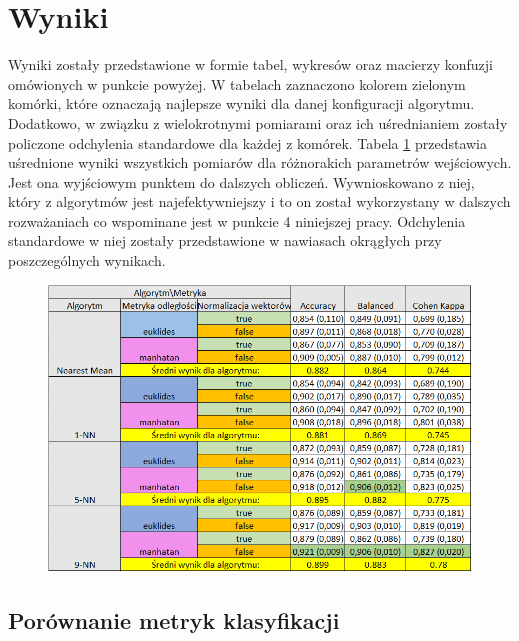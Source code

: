 \documentclass[12pt]{article}
\begin{document}
\section{Wyniki}
Wyniki zostały przedstawione w formie tabel, wykresów oraz macierzy konfuzji omówionych w punkcie powyżej. W tabelach zaznaczono kolorem zielonym komórki, które oznaczają najlepsze wyniki dla danej konfiguracji algorytmu. Dodatkowo, w związku z wielokrotnymi pomiarami oraz ich uśrednianiem zostały policzone odchylenia standardowe dla każdej z komórek. Tabela  \ref{glowna_tabela} przedstawia uśrednione wyniki wszystkich pomiarów dla różnorakich parametrów wejściowych. Jest ona wyjściowym punktem do dalszych obliczeń. Wywnioskowano z niej, który z algorytmów jest najefektywniejszy i to on został wykorzystany w dalszych rozważaniach co wspominane jest w punkcie 4 niniejszej pracy.  Odchylenia standardowe w niej zostały przedstawione w nawiasach okrągłych przy poszczególnych wynikach.
\indent 
\newpage 
\begin{figure}[H]
	\centering
	\label{glowna_tabela}
		\includegraphics[scale=0.75]{images/ogolna_tabela.png}
\end{figure}


\subsection{Porównanie metryk klasyfikacji}
\end{document}
